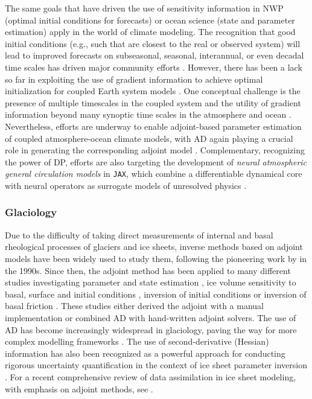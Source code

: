 The same goals that have driven the use of sensitivity information in NWP (optimal initial conditions for forecasts) or ocean science (state and parameter estimation) apply in the world of climate modeling.
The recognition that good initial conditions (e.g., such that are closest to the real or observed system) will lead to improved forecasts on subseasonal, seasonal, interannual, or even decadal time scales has driven major community efforts \cite{Meehl.2021}. 
However, there has been a lack so far in exploiting the use of gradient information to achieve optimal initialization for coupled Earth system models \cite{Frolov.2023}. 
One conceptual challenge is the presence of multiple timescales in the coupled system and the utility of gradient information beyond many synoptic time scales in the atmosphere and ocean \cite{Lea.2000,Lea:2002cv}.
Nevertheless, efforts are underway to enable adjoint-based parameter estimation of coupled atmosphere-ocean climate models, with AD again playing a crucial role in generating the corresponding adjoint model
\cite{Blessing.2014,Lyu.2018,Stammer:2018de}.
Complementary, recognizing the power of DP, efforts are also targeting the development of \textit{neural atmospheric general circulation models} in \texttt{JAX}, which combine a differentiable dynamical core with neural operators as surrogate models of unresolved physics
\cite{Kochkov.2023}.

\subsubsection{Glaciology}

Due to the difficulty of taking direct measurements of internal and basal rheological processes of glaciers and ice sheets, inverse methods based on adjoint models have been widely used to study them, following the pioneering work by \cite{macayeal1992basal} in the 1990s. 
Since then, the adjoint method has been applied to many different studies investigating parameter and state estimation \cite{Vieli.2006, goldberg2013parameter}, ice volume sensitivity to basal, surface and initial conditions \cite{heimbach2009greenland}, inversion of initial conditions \cite{mosbeux2016comparison} or inversion of basal friction \cite{Petra.2012, morlighem2013inversion}.
These studies either derived the adjoint with a manual implementation or combined AD with hand-written adjoint solvers. 
The use of AD has become increasingly widespread in glaciology, paving the way for more complex modelling frameworks \cite{hascoet2018source, Gaikwad.2023}. 
The use of second-derivative (Hessian) information has also been recognized as a powerful approach for conducting rigorous uncertainty quantification in the context of ice sheet parameter inversion \cite{Petra.2014,Isaac:2015hf}.
For a recent comprehensive review of data assimilation in ice sheet modeling, with emphasis on adjoint methods, see \cite{Morlighem.2023}.

